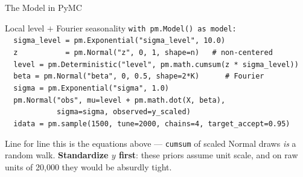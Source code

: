 \documentclass[aspectratio=169, 11pt]{beamer}
\begin{document}
\begin{frame}{The Model in PyMC}
  \begin{examplebox}{Local level $+$ Fourier seasonality}
    {\tiny\linespread{1.0}\selectfont
    \texttt{with pm.Model() as model:}\\
    \texttt{\ \ sigma\_level = pm.Exponential("sigma\_level", 10.0)}\\
    \texttt{\ \ z\ \ \ \ \ \ \ \ \ \ \ = pm.Normal("z", 0, 1, shape=n)\ \ \ \# non-centered}\\
    \texttt{\ \ level = pm.Deterministic("level", pm.math.cumsum(z * sigma\_level))}\\
    \texttt{\ \ beta\ = pm.Normal("beta", 0, 0.5, shape=2*K)\ \ \ \ \ \ \# Fourier}\\
    \texttt{\ \ sigma = pm.Exponential("sigma", 1.0)}\\[2pt]
    \texttt{\ \ pm.Normal("obs", mu=level + pm.math.dot(X, beta),}\\
    \texttt{\ \ \ \ \ \ \ \ \ \ \ \ sigma=sigma, observed=y\_scaled)}\\
    \texttt{\ \ idata = pm.sample(1500, tune=2000, chains=4, target\_accept=0.95)}
    }
  \end{examplebox}
  Line for line this is the equations above --- \texttt{cumsum} of scaled Normal draws \emph{is}
  a random walk. \textbf{Standardize $y$ first}: these priors assume unit scale, and on raw units
  of 20{,}000 they would be absurdly tight.
\end{frame}
\end{document}
